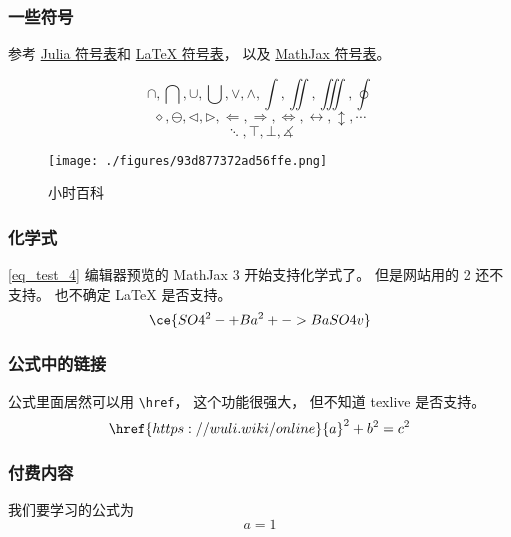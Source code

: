 
\subsubsection{一些符号}
参考 \href{https://docs.julialang.org/en/v1/manual/unicode-input/}{Julia 符号表}和 \href{https://oeis.org/wiki/List_of_LaTeX_mathematical_symbols}{LaTeX 符号表}， 以及 \href{http://www.onemathematicalcat.org/MathJaxDocumentation/TeXSyntax.htm}{MathJax 符号表}。

\begin{equation}\label{eq_test_4}
\cap, \bigcap, \cup, \bigcup, \vee, \wedge, \int, \iint, \iiint, \oint
\end{equation}
\begin{equation}
\diamond, \ominus, \triangleleft, \triangleright, \Longleftarrow, \Longrightarrow, \iff, \leftrightarrow, \updownarrow, \cdots
\end{equation}
\begin{equation}
\ddots, \top, \bot, \measuredangle
\end{equation}

\begin{figure}[ht]
\centering
\texttt{[image: ./figures/93d877372ad56ffe.png]}
\caption{小时百科} \label{fig_test_1}
\end{figure}

\subsubsection{化学式}
\autoref{eq_test_4} 编辑器预览的 MathJax 3 开始支持化学式了。 但是网站用的 2 还不支持。 也不确定 LaTeX 是否支持。
\begin{equation}
\ce{SO4^2- + Ba^2+ -> BaSO4 v}
\end{equation}

\subsubsection{公式中的链接}
公式里面居然可以用 \verb|\href|， 这个功能很强大， 但不知道 texlive 是否支持。
\begin{equation}
\href{https://wuli.wiki/online}{a}^2 + b^2 = c^2
\end{equation}

\subsubsection{付费内容}
我们要学习的公式为
\begin{equation}\label{eq_test_1}
a = 1
\end{equation}


